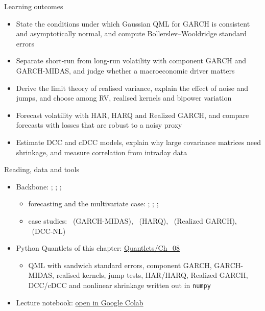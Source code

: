 \begin{frame}{Learning outcomes}
\itemsize{\small}
\begin{itemize}
    \item State the conditions under which Gaussian QML for GARCH is consistent and asymptotically normal, and compute Bollerslev--Wooldridge standard errors
    \item Separate short-run from long-run volatility with component GARCH and GARCH-MIDAS, and judge whether a macroeconomic driver matters
    \item Derive the limit theory of realised variance, explain the effect of noise and jumps, and choose among RV, realised kernels and bipower variation
    \item Forecast volatility with HAR, HARQ and Realized GARCH, and compare forecasts with losses that are robust to a noisy proxy
    \item Estimate DCC and cDCC models, explain why large covariance matrices need shrinkage, and measure correlation from intraday data
\end{itemize}
\end{frame}

\begin{frame}{Reading, data and tools}
\itemsize{\small}
\begin{itemize}
    \item Backbone: ; ; ; 
    \begin{itemize}
        \item forecasting and the multivariate case: ; ; ; 
        \item case studies: \ (GARCH-MIDAS), \ (HARQ), \ (Realized GARCH), \ (DCC-NL)
    \end{itemize}
    \item Python Quantlets of this chapter: \href{https://github.com/danpele/Advanced-Time-Series/tree/main/Quantlets/Ch_08}{Quantlets/Ch\_08}
    \begin{itemize}
        \item QML with sandwich standard errors, component GARCH, GARCH-MIDAS, realised kernels, jump tests, HAR/HARQ, Realized GARCH, DCC/cDCC and nonlinear shrinkage written out in \texttt{numpy}
    \end{itemize}
    \item Lecture notebook: \href{\colaburl{notebooks/EN/chapter8_lecture_notebook.ipynb}}{open in Google Colab}
\end{itemize}
\end{frame}

